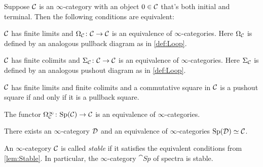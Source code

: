\begin{lem}\label{lem:Stable}
	Suppose $\mathcal{C}$ is an $\infty$-category with an object $0\in \mathcal{C}$ that's both initial and terminal. Then the following conditions are equivalent:
	\begin{alphanumerate}
		\item $\mathcal{C}$ has finite limits and $\Omega_{\mathcal{C}}\colon \mathcal{C}\rightarrow\mathcal{C}$ is an equivalence of $\infty$-categories. Here $\Omega_{\mathcal{C}}$ is defined by an analogous pullback diagram as in \cref{def:Loop}.\label{enum:OmegaEquivalence}
		\item $\mathcal{C}$ has finite colimits and $\Sigma_{\mathcal{C}}\colon \mathcal{C}\rightarrow \mathcal{C}$ is an equivalence of $\infty$-categories. Here $\Sigma_{\mathcal{C}}$ is defined by an analogous pushout diagram as in \cref{def:Loop}.\label{enum:SigmaEquivalence}
		\item $\mathcal{C}$ has finite limits and finite colimits and a commutative square in $\mathcal{C}$ is a pushout square if and only if it is a pullback square.\label{enum:PushoutPullback}
		\item \!The functor $\Omega_{\mathcal{C}}^\infty\colon \mathrm{Sp}(\mathcal{C})\rightarrow \mathcal{C}$ is an equivalence of $\infty$-categories.\label{enum:SpCisC}
		\item \!There exists an $\infty$-category $\mathcal{D}$ and an equivalence of $\infty$-categories $\mathrm{Sp}(\mathcal{D})\simeq\mathcal{C}$.\label{enum:SpDisC}
	\end{alphanumerate}
\end{lem}
\begin{defi}\label{def:Stable}
	An $\infty$-category $\mathcal{C}$ is called \emph{stable} if it satisfies the equivalent conditions from \cref{lem:Stable}. In particular, the $\infty$-category $\cat{Sp}$ of spectra is stable.
\end{defi}
